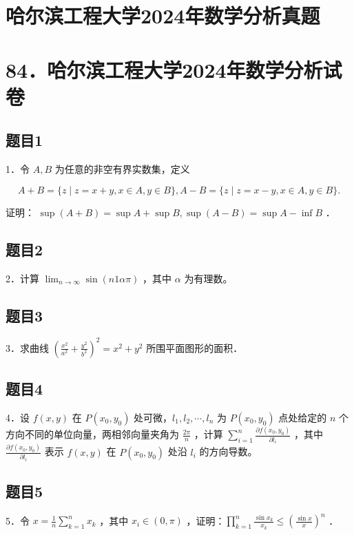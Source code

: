 \documentclass{article}
\begin{document}
\section*{哈尔滨工程大学2024年数学分析真题}
\section*{84．哈尔滨工程大学2024年数学分析试卷}

\subsection{题目1}
1．令 \(A, B\) 为任意的非空有界实数集，定义

\[
A+B=\{z \mid z=x+y, x \in A, y \in B\}, A-B=\{z \mid z=x-y, x \in A, y \in B\} .
\]

证明： \(\sup (A+B)=\sup A+\sup B, \sup (A-B)=\sup A-\inf B\) ．

\subsection{题目2}
2．计算 \(\lim _{n \rightarrow \infty} \sin (n 1 \alpha \pi)\) ，其中 \(\alpha\) 为有理数。

\subsection{题目3}
3．求曲线 \(\left(\frac{x^{2}}{a^{2}}+\frac{y^{2}}{b^{2}}\right)^{2}=x^{2}+y^{2}\) 所围平面图形的面积．

\subsection{题目4}
4．设 \(f(x, y)\) 在 \(P\left(x_{0}, y_{0}\right)\) 处可微，\(l_{1}, l_{2}, \cdots, l_{n}\) 为 \(P\left(x_{0}, y_{0}\right)\) 点处给定的 \(n\) 个方向不同的单位向量，两相邻向量夹角为 \(\frac{2 \pi}{n}\) ，计算 \(\sum_{i=1}^{n} \frac{\partial f\left(x_{0}, y_{0}\right)}{\partial l_{i}}\) ，其中 \(\frac{\partial f\left(x_{0}, y_{0}\right)}{\partial l_{i}}\) 表示 \(f(x, y)\) 在 \(P\left(x_{0}, y_{0}\right)\) 处沿 \(l_{i}\) 的方向导数。

\subsection{题目5}
5．令 \(x=\frac{1}{n} \sum_{k=1}^{n} x_{k}\) ，其中 \(x_{i} \in(0, \pi)\) ，证明：\(\prod_{k=1}^{n} \frac{\sin x_{k}}{x_{k}} \leq\left(\frac{\sin x}{x}\right)^{n}\) ．
\end{document}
